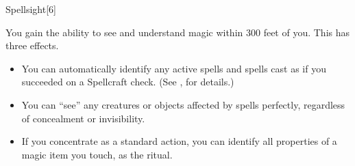 \begin{spellsection}{Spellsight}[6]
    \begin{spellheader}
    \end{spellheader}
    \begin{spellcontent}
        \begin{spelltargetinginfo}
        \end{spelltargetinginfo}
        \begin{spelleffects}
            \spelleffect You gain the ability to see and understand magic within 300 feet of you. This has three effects.
            \begin{itemize}
                \item You can automatically identify any active spells and spells cast as if you succeeded on a Spellcraft check. (See , for details.)
                \item You can ``see'' any creatures or objects affected by spells perfectly, regardless of concealment or invisibility.
                \item If you concentrate as a standard action, you can identify all properties of a magic item you touch, as the  ritual.
            \end{itemize}
            \spelldur \durlong
        \end{spelleffects}
    \end{spellcontent}
    \begin{spellfooter}
        \miscastexplode
    \end{spellfooter}
    \begin{spellaugments}
    \end{spellaugments}
\end{spellsection}

